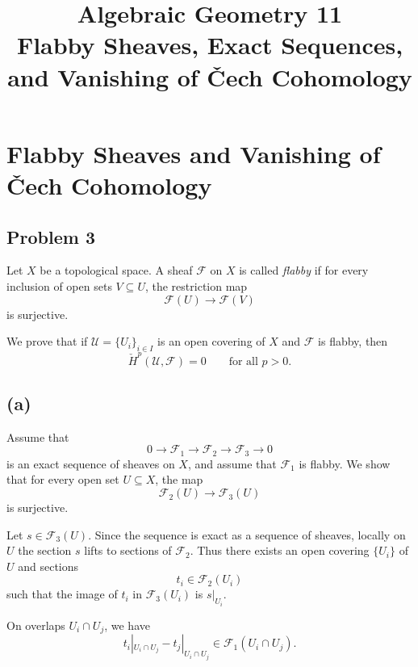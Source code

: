 \documentclass[12pt,a4paper]{article}
\theoremstyle{notespace}
\begin{document}
\title{Algebraic Geometry 11\\
	\large Flabby Sheaves, Exact Sequences, and Vanishing of \v{C}ech Cohomology}
\author{}
\date{}

	\maketitle
	

	\setcounter{section}{0}

\tableofcontents

	\clearpage

\section{Flabby Sheaves and Vanishing of \v{C}ech Cohomology}

\subsection{Problem 3}

Let $X$ be a topological space. A sheaf $\mathcal F$ on $X$ is called
\emph{flabby} if for every inclusion of open sets $V \subseteq U$, the
restriction map
\[
\mathcal F(U) \longrightarrow \mathcal F(V)
\]
is surjective.

We prove that if $\mathcal U=\{U_i\}_{i\in I}$ is an open covering of $X$
and $\mathcal F$ is flabby, then
\[
\check H^p(\mathcal U,\mathcal F)=0
\qquad \text{for all } p>0.
\]

\subsection*{(a)}

Assume that
\[
0 \longrightarrow \mathcal F_1
\longrightarrow \mathcal F_2
\longrightarrow \mathcal F_3
\longrightarrow 0
\]
is an exact sequence of sheaves on $X$, and assume that $\mathcal F_1$ is
flabby. We show that for every open set $U\subseteq X$, the map
\[
\mathcal F_2(U)\longrightarrow \mathcal F_3(U)
\]
is surjective.

Let $s\in \mathcal F_3(U)$. Since the sequence is exact as a sequence of
sheaves, locally on $U$ the section $s$ lifts to sections of $\mathcal F_2$.
Thus there exists an open covering $\{U_i\}$ of $U$ and sections
\[
t_i\in \mathcal F_2(U_i)
\]
such that the image of $t_i$ in $\mathcal F_3(U_i)$ is $s|_{U_i}$.

On overlaps $U_i\cap U_j$, we have
\[
t_i|_{U_i\cap U_j}-t_j|_{U_i\cap U_j}
\in \mathcal F_1(U_i\cap U_j).
\]
\end{document}
